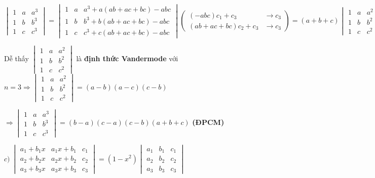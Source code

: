 \documentclass[12pt]{report}
\begin{document}
$\begin{vmatrix}
	1 & a & a^3 \\
	1 & b & b^3 \\
	1 & c & c^3
\end{vmatrix} = \begin{vmatrix}
1 & a & a^3 + a(ab + ac + bc) - abc\\
1 & b & b^3 + b(ab + ac + bc) - abc\\
1 & c & c^3 + c(ab + ac + bc) - abc
\end{vmatrix} \left( \begin{smallmatrix}
(-abc)c_1 + c_3 &\to c_3\\
(ab + ac + bc)c_2 + c_3 &\to c_3 
\end{smallmatrix}\right) = (a + b + c)\begin{vmatrix}
1 & a & a^2 \\
1 & b & b^2 \\
1 & c & c^2
\end{vmatrix}$

Dễ thấy $\begin{vmatrix}
1 & a & a^2 \\
1 & b & b^2 \\
1 & c & c^2
\end{vmatrix}$ là \textbf{định thức Vandermode} với $n = 3 \Rightarrow \begin{vmatrix}
1 & a & a^2 \\
1 & b & b^2 \\
1 & c & c^2
\end{vmatrix} = (a-b)(a-c)(c-b)$

$\Rightarrow \begin{vmatrix}
1 & a & a^3 \\
1 & b & b^3 \\
1 & c & c^3
\end{vmatrix} = (b-a)(c-a)(c-b)(a+b+c)$ \textbf{(ĐPCM)}

$c)\ \begin{vmatrix}
	a_1+b_1x & a_1x+b_1 & c_1 \\
	a_2+b_2x & a_2x+b_2 & c_2 \\
	a_3+b_3x & a_3x+b_3 & c_3
\end{vmatrix}
= (1-x^2)
\begin{vmatrix}
	a_1 & b_1 & c_1 \\
	a_2 & b_2 & c_2 \\
	a_3 & b_3 & c_3
\end{vmatrix}$
\end{document}
